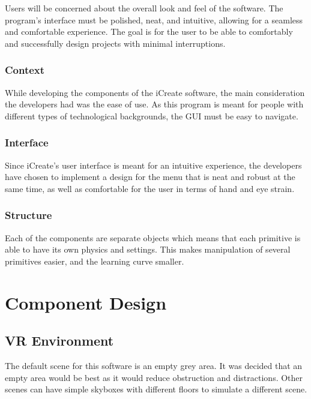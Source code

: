 \documentclass[draftclsnofoot,onecolumn,compsoc]{IEEEtran}
\begin{document}
Users will be concerned about the overall look and feel of the software. The program’s interface must be polished, neat, and intuitive, allowing for a seamless and comfortable experience. The goal is for the user to be able to comfortably and successfully design projects with minimal interruptions.


\subsubsection{Context}
While developing the components of the iCreate software, the main consideration the developers had was the ease of use. As this program is meant for people with different types of technological backgrounds, the GUI must be easy to navigate.


\subsubsection{Interface}
Since iCreate’s user interface is meant for an intuitive experience, the developers have chosen to implement a design for the menu that is neat and robust at the same time, as well as comfortable for the user in terms of hand and eye strain.

\subsubsection{Structure}
Each of the components are separate objects which means that each primitive is able to have its own physics and settings. This makes manipulation of several primitives easier, and the learning curve smaller.


\section{Component Design}

\subsection{VR Environment}

The default scene for this software is an empty grey area. It was decided that an empty area would be best as it would reduce obstruction and distractions. Other scenes can have simple skyboxes with different floors to simulate a different scene. 
\end{document}
